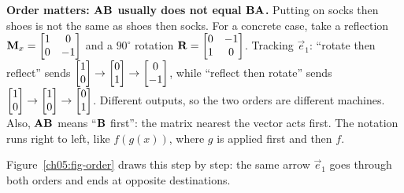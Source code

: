 \begin{trapbox}
\textbf{Order matters: $\mathbf{A}\mathbf{B}$ usually does not equal $\mathbf{B}\mathbf{A}$.}
Putting on socks then shoes is not the same as shoes then socks. For a concrete
case, take a reflection $\mathbf{M}_x = \begin{bmatrix}1&0\\0&-1\end{bmatrix}$ and a
$90^\circ$ rotation $\mathbf{R} = \begin{bmatrix}0&-1\\1&0\end{bmatrix}$. Tracking
$\vec{e}_1$: ``rotate then reflect'' sends $\begin{bmatrix}1\\0\end{bmatrix}\to\begin{bmatrix}0\\1\end{bmatrix}\to
\begin{bmatrix}0\\-1\end{bmatrix}$, while ``reflect then rotate'' sends $\begin{bmatrix}1\\0\end{bmatrix}\to\begin{bmatrix}1\\0\end{bmatrix}
\to\begin{bmatrix}0\\1\end{bmatrix}$. Different outputs, so the two orders are different machines.
Also, $\mathbf{A}\mathbf{B}$ means ``$\mathbf{B}$ first'': the matrix nearest the
vector acts first. The notation runs right to left, like $f(g(x))$, where $g$ is
applied first and then $f$.
\end{trapbox}

Figure~\ref{ch05:fig-order} draws this step by step: the same arrow $\vec{e}_1$
goes through both orders and ends at opposite destinations.


